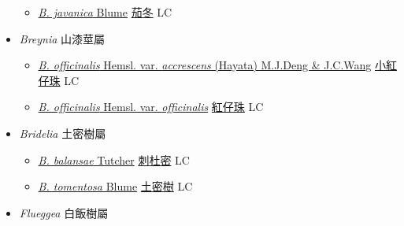 \begin{itemize}
  \begin{itemize}
        \item[] \href{http://www.theplantlist.org/tpl1.1/search?q=Bischofia+javanica}{\textit{B. javanica} Blume}   \href{\detokenize{http://taibnet.sinica.edu.tw/chi/taibnet_species_list.php?T2=茄冬&T2_new_value=true&fr=y}}{茄冬} LC
  \end{itemize}
 \item[] \textit{Breynia} 山漆莖屬
                    
  \begin{itemize}
        \item[] \href{http://www.theplantlist.org/tpl1.1/search?q=Breynia+officinalis+var.+accrescens}{\textit{B. officinalis} Hemsl. var. \textit{accrescens} (Hayata) M.J.Deng \& J.C.Wang}   \href{\detokenize{http://taibnet.sinica.edu.tw/chi/taibnet_species_list.php?T2=小紅仔珠&T2_new_value=true&fr=y}}{小紅仔珠} LC
        \item[] \href{http://www.theplantlist.org/tpl1.1/search?q=Breynia+officinalis+var.+officinalis}{\textit{B. officinalis} Hemsl. var. \textit{officinalis}}   \href{\detokenize{http://taibnet.sinica.edu.tw/chi/taibnet_species_list.php?T2=紅仔珠&T2_new_value=true&fr=y}}{紅仔珠} LC
  \end{itemize}
 \item[] \textit{Bridelia} 土密樹屬
                    
  \begin{itemize}
        \item[] \href{http://www.theplantlist.org/tpl1.1/search?q=Bridelia+balansae}{\textit{B. balansae} Tutcher}   \href{\detokenize{http://taibnet.sinica.edu.tw/chi/taibnet_species_list.php?T2=刺杜密&T2_new_value=true&fr=y}}{刺杜密} LC
        \item[] \href{http://www.theplantlist.org/tpl1.1/search?q=Bridelia+tomentosa}{\textit{B. tomentosa} Blume}   \href{\detokenize{http://taibnet.sinica.edu.tw/chi/taibnet_species_list.php?T2=土密樹&T2_new_value=true&fr=y}}{土密樹} LC
  \end{itemize}
 \item[] \textit{Flueggea} 白飯樹屬
                    

\end{itemize}
